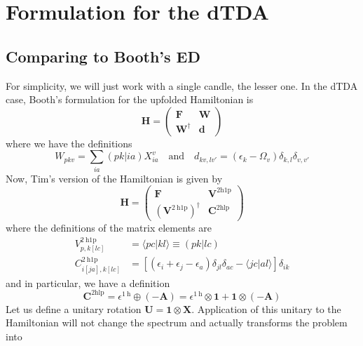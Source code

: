\section{Formulation for the dTDA}
\subsection{Comparing to Booth's ED}
For simplicity, we will just work with a single candle, the lesser one. In the dTDA case, Booth's formulation for the upfolded Hamiltonian is
\begin{equation}
    \bm{H} = \begin{pmatrix} \bm{F} & \bm{W} \\ \bm{W}^{\dagger} & \bm{d} \end{pmatrix}
\label{eq:booth_hamiltonian}
\end{equation}
where we have the definitions
\begin{equation}
    W_{pkv} = \sum_{ia} (pk|ia) X_{ia}^{v} \quad \text{and} \quad d_{kv,lv'} = \left(\epsilon_k - \Omega_v\right) \delta_{k,l} \delta_{v,v'}
\label{eq:booth_definitions}
\end{equation}
Now, Tim's version of the Hamiltonian is given by
\begin{equation}
    \bm{H} = \begin{pmatrix} \bm{F} & \bm{V}^{2 \mathrm{h1p}}\\ \left(\bm{V}^{2 \mathrm{~h} 1 \mathrm{p}}\right)^{\dagger} & \bm{C}^{2 \mathrm{hlp}} \end{pmatrix}
\label{eq:tim_hamiltonian}
\end{equation}
where the definitions of the matrix elements are
\begin{align}
    V_{p, k[l c]}^{2 \mathrm{~h} 1 \mathrm{p}} &= \langle p c | k l \rangle \equiv (pk|lc) \\
    C_{i[j a], k[l c]}^{2 \mathrm{~h} 1 \mathrm{p}} &= \left[\left(\epsilon_i+\epsilon_j-\epsilon_a\right) \delta_{j l} \delta_{a c}-\langle j c | a l \rangle\right] \delta_{i k}
\end{align}
and in particular, we have a definition 
\begin{equation}
    \bm{C}^{2 \mathrm{hlp}} = \epsilon^{1 \mathrm{~h}} \oplus (-\bm{A}) = \epsilon^{1 \mathrm{~h}} \otimes \bm{1} + \bm{1} \otimes (-\bm{A})
\label{eq:tim_c_hlp}
\end{equation}
Let us define a unitary rotation $\bm{U} = \bm{1} \otimes \bm{X}$. Application of this unitary to the Hamiltonian will not change the spectrum and actually transforms the problem into
